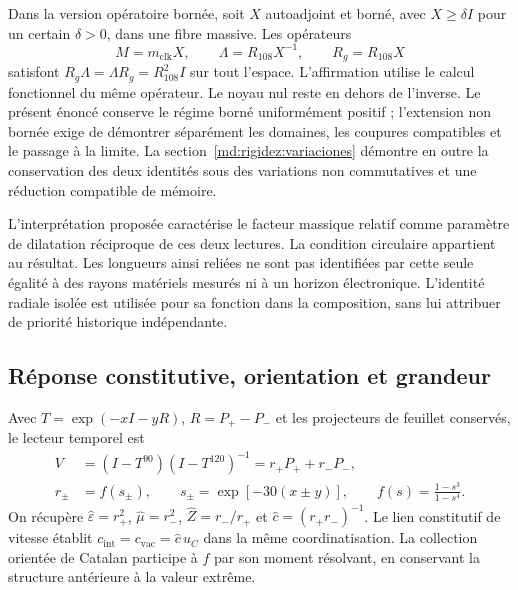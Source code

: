 Dans la version opératoire bornée, soit $X$ autoadjoint et borné, avec
$X\geq\delta I$ pour un certain $\delta>0$, dans une fibre massive. Les opérateurs
\begin{equation}
 M=m_{\mathrm{clk}}X,\qquad
 \Lambda=R_{108}X^{-1},\qquad R_g=R_{108}X
 \label{md:hib:operadores-radiales}
\end{equation}
satisfont $R_g\Lambda=\Lambda R_g=R_{108}^2I$ sur tout l’espace.
L’affirmation utilise le calcul fonctionnel du même opérateur. Le noyau
nul reste en dehors de l’inverse. Le présent énoncé conserve le régime
borné uniformément positif ; l’extension non bornée exige de démontrer
séparément les domaines, les coupures compatibles et le passage à la limite.
La section~\ref{md:rigidez:variaciones} démontre en outre la conservation
des deux identités sous des variations non commutatives et une réduction
compatible de mémoire.

L’interprétation proposée caractérise le facteur massique relatif comme
paramètre de dilatation réciproque de ces deux lectures. La condition circulaire
appartient au résultat. Les longueurs ainsi reliées ne sont pas identifiées
par cette seule égalité à des rayons matériels mesurés ni à un horizon
électronique. L’identité radiale isolée est utilisée pour sa fonction dans la
composition, sans lui attribuer de priorité historique indépendante.

\subsection{Réponse constitutive, orientation et grandeur}
\label{md:hib:constitutivas}

Avec $T=\exp(-xI-yR)$, $R=P_+-P_-$ et les projecteurs de feuillet conservés,
le lecteur temporel est
\begin{equation}
 \begin{aligned}
 V&=(I-T^{90})(I-T^{120})^{-1}=r_+P_++r_-P_-,\\
 r_\pm&=f(s_\pm),\qquad
 s_\pm=\exp[-30(x\pm y)],\qquad
 f(s)=\frac{1-s^3}{1-s^4}.
 \end{aligned}
 \label{md:hib:operador-constitutivo}
\end{equation}
On récupère $\widehat\varepsilon=r_+^2$, $\widehat\mu=r_-^2$,
$\widehat Z=r_-/r_+$ et $\widehat c=(r_+r_-)^{-1}$.
Le lien constitutif de vitesse établit
$c_{\mathrm{int}}=c_{\mathrm{vac}}=\widehat c\,u_C$ dans la même coordinatisation.
La collection orientée de Catalan participe à $f$ par son moment
résolvant, en conservant la structure antérieure à la valeur extrême.


